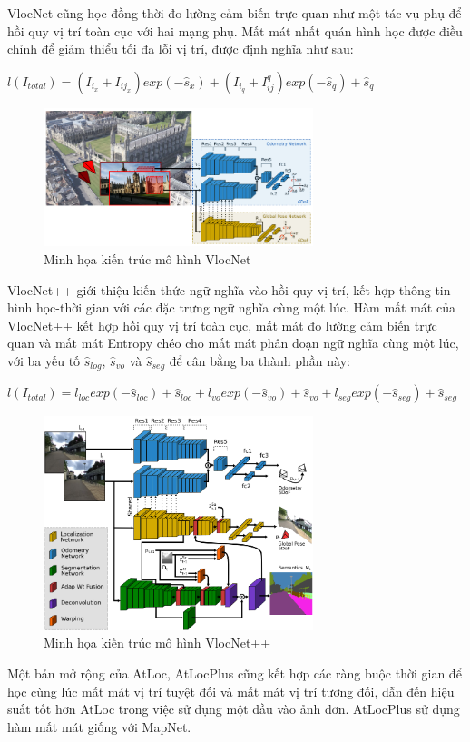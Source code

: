 VlocNet \cite{valada2018deep} cũng học đồng thời đo lường cảm biến trực quan như một tác vụ phụ để hồi quy vị trí toàn cục với hai mạng phụ. Mất mát nhất quán hình học được điều chỉnh để giảm thiểu tối đa lỗi vị trí, được định nghĩa như sau:
\begin{center}
    $l(I_{total}) = (I_{i_x} + I_{ij_x})exp(-\hat{s}_x) + (I_{i_q} + I^{q}_{ij})exp(-\hat{s}_q)+ \hat{s}_q$
\end{center}
\begin{figure}[H]
    \centering
    \includegraphics[width=0.7\textwidth]{pics/Chapter2/vlocnet.png}
    \caption{Minh họa kiến trúc mô hình VlocNet \cite{valada2018deep}}
\end{figure}
VlocNet++ \cite{Radwan_2018} giới thiệu kiến thức ngữ nghĩa vào hồi quy vị trí, kết hợp thông tin hình học-thời gian với các đặc trưng ngữ nghĩa cùng một lúc. Hàm mất mát của VlocNet++ kết hợp hồi quy vị trí toàn cục, mất mát đo lường cảm biến trực quan và mất mát Entropy chéo cho mất mát phân đoạn ngữ nghĩa cùng một lúc, với ba yếu tố $\hat{s}_{log}$, $\hat{s}_{vo}$ và $\hat{s}_{seg}$ để cân bằng ba thành phần này:
\begin{center}
    $ l(I_{total}) = l_{loc}exp(-\hat{s}_{loc})+ \hat{s}_{loc}+l_{vo}exp(-\hat{s}_{vo})+ \hat{s}_{vo}+l_{seg}exp(-\hat{s}_{seg})+ \hat{s}_{seg}$
\end{center}
\begin{figure}[H]
    \centering
    \includegraphics[width=0.7\textwidth]{pics/Chapter2/vlocnetplus.png}
    \caption{Minh họa kiến trúc mô hình VlocNet++ \cite{Radwan_2018}}
\end{figure}
Một bản mở rộng của AtLoc, AtLocPlus \cite{wang2019atloc} cũng kết hợp các ràng buộc thời gian để học cùng lúc mất mát vị trí tuyệt đối và mất mát vị trí tương đối, dẫn đến hiệu suất tốt hơn AtLoc trong việc sử dụng một đầu vào ảnh đơn. AtLocPlus sử dụng hàm mất mát giống với MapNet.

